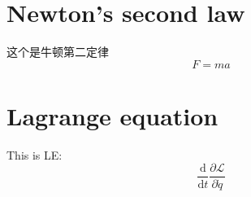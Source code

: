 \documentclass{article}
\begin{document}
\section{Newton's second law}
这个是牛顿第二定律
    $$
    F=ma
    $$

\section{Lagrange equation}
This is LE:
$$
\dfrac{\mathrm{d}}{\mathrm{d}t}\dfrac{\partial\mathcal{L}}{\partial\dot{q}}
$$
\end{document}
